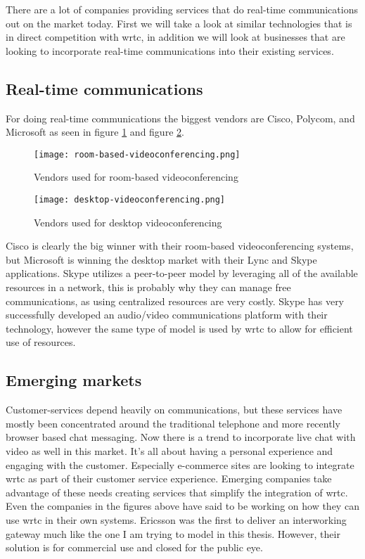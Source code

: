 There are a lot of companies providing services that do real-time communications out on the market today. First we will take a look at similar technologies\cite{lopez_fernandez_catalysing_2013} that is in direct competition with \gls{wrtc}, in addition we will look at businesses that are looking to incorporate real-time communications into their existing services.

\subsection{Real-time communications}
For doing real-time communications the biggest vendors are Cisco, Polycom, and Microsoft as seen in figure \ref{fig:room-based-videoconferencing} and figure \ref{fig:desktop-videoconferencing}.

\begin{figure}[here]
\centerline{\texttt{[image: room-based-videoconferencing.png]}}
\label{fig:room-based-videoconferencing}
\caption{Vendors used for room-based videoconferencing}
\end{figure}

\begin{figure}[here]
\centerline{\texttt{[image: desktop-videoconferencing.png]}}
\caption{Vendors used for desktop videoconferencing}
\label{fig:desktop-videoconferencing}
\end{figure}

Cisco is clearly the big winner with their room-based videoconferencing systems, but Microsoft is winning the desktop market with their Lync and Skype applications. Skype utilizes a peer-to-peer model by leveraging all of the available resources in a network, this is probably why they can manage free communications, as using centralized resources are very costly. Skype has very successfully developed an audio/video communications platform with their technology, however the same type of model is used by \gls{wrtc} to allow for efficient use of resources.

\subsection{Emerging markets}
Customer-services depend heavily on communications, but these services have mostly been concentrated around the traditional telephone and more recently browser based chat messaging. Now there is a trend to incorporate live chat with video as well in this market\cite{amazon_mayday}. It's all about having a personal experience and engaging with the customer. Especially e-commerce sites are looking to integrate \gls{wrtc} as part of their customer service experience. Emerging companies take advantage of these needs creating services that simplify the integration of \gls{wrtc}. Even the companies in the figures above have said to be working on how they can use \gls{wrtc} in their own systems. Ericsson was the first to deliver an interworking gateway\cite{ericsson-gateway} much like the one I am trying to model in this thesis. However, their solution is for commercial use and closed for the public eye.

